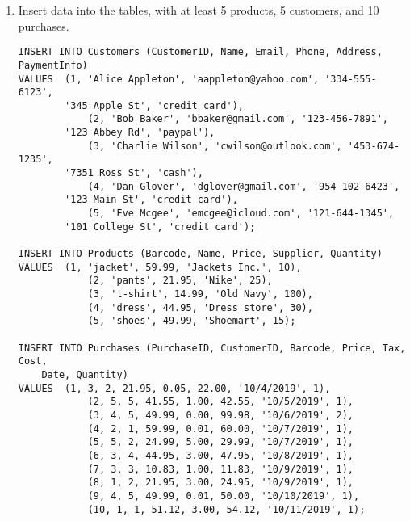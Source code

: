 \documentclass[notitlepage, 11pt]{report}
\begin{document}
\begin{enumerate}[itemindent=-1.5em]
\begin{lstlisting}
\end{lstlisting}
	\item Insert data into the tables, with at least 5 products, 5 customers, and 10 purchases.
\begin{lstlisting}
INSERT INTO Customers (CustomerID, Name, Email, Phone, Address, PaymentInfo)
VALUES	(1, 'Alice Appleton', 'aappleton@yahoo.com', '334-555-6123', 
		'345 Apple St', 'credit card'),
			(2, 'Bob Baker', 'bbaker@gmail.com', '123-456-7891', 
		'123 Abbey Rd', 'paypal'),
			(3, 'Charlie Wilson', 'cwilson@outlook.com', '453-674-1235', 
		'7351 Ross St', 'cash'),
			(4, 'Dan Glover', 'dglover@gmail.com', '954-102-6423', 
		'123 Main St', 'credit card'),
			(5, 'Eve Mcgee', 'emcgee@icloud.com', '121-644-1345', 
		'101 College St', 'credit card');

INSERT INTO Products (Barcode, Name, Price, Supplier, Quantity)
VALUES	(1, 'jacket', 59.99, 'Jackets Inc.', 10),
			(2, 'pants', 21.95, 'Nike', 25),
			(3, 't-shirt', 14.99, 'Old Navy', 100),
			(4, 'dress', 44.95, 'Dress store', 30),
			(5, 'shoes', 49.99, 'Shoemart', 15);

INSERT INTO Purchases (PurchaseID, CustomerID, Barcode, Price, Tax, Cost, 
	Date, Quantity)
VALUES	(1, 3, 2, 21.95, 0.05, 22.00, '10/4/2019', 1),
			(2, 5, 5, 41.55, 1.00, 42.55, '10/5/2019', 1),
			(3, 4, 5, 49.99, 0.00, 99.98, '10/6/2019', 2),
			(4, 2, 1, 59.99, 0.01, 60.00, '10/7/2019', 1),
			(5, 5, 2, 24.99, 5.00, 29.99, '10/7/2019', 1),
			(6, 3, 4, 44.95, 3.00, 47.95, '10/8/2019', 1),
			(7, 3, 3, 10.83, 1.00, 11.83, '10/9/2019', 1),
			(8, 1, 2, 21.95, 3.00, 24.95, '10/9/2019', 1),
			(9, 4, 5, 49.99, 0.01, 50.00, '10/10/2019', 1),
			(10, 1, 1, 51.12, 3.00, 54.12, '10/11/2019', 1);
\end{lstlisting}
\end{enumerate}
\end{document}
